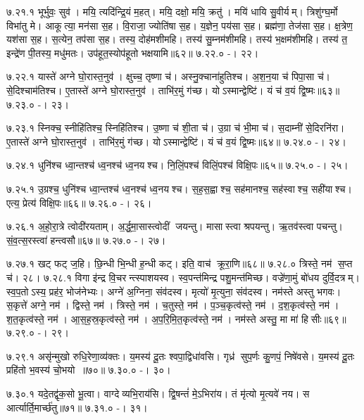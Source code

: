 ७.२१.१
भूर्भुवः॒ सुव॑। मयि॒ त्यदि॑न्द्रि॒यं म॒हत्। मयि॒ दक्षो॒ मयि॒ क्रतु॑। मयि॑ धायि सु॒वीर्यम्। त्रिशु॑ग्घ॒र्मो विभा॑तु मे। आकूत्या॒ मन॑सा स॒ह। वि॒राजा॒ ज्योति॑षा स॒ह। य॒ज्ञेन॒ पय॑सा स॒ह। ब्रह्म॑णा॒ तेज॑सा स॒ह। क्ष॒त्रेण॒ यश॑सा स॒ह। स॒त्येन॒ तप॑सा स॒ह। तस्य॒ दोह॑मशीमहि। तस्य॑ सु॒म्नम॑शीमहि। तस्य॑ भ॒क्षम॑शीमहि। तस्य॑ त॒ इन्द्रे॑ण पी॒तस्य॒ मधु॑मतः। उप॑हूत॒स्योप॑हूतो भक्षयामि॥६२॥
७.२२.०
-। २२।
\anuvakamend


७.२२.१
यास्ते॑ अग्ने घो॒रास्त॒नुव॑। क्षुच्च॒ तृष्णा च॑। अस्नु॒क्चाना॑हुतिश्च। अ॒श॒न॒या च॑ पिपा॒सा च॑। से॒दिश्चाम॑तिश्च। ए॒तास्ते॑ अग्ने घो॒रास्त॒नुव॑। ताभि॑र॒मुं ग॑च्छ। योऽस्मान्द्वेष्टि॑। यं च॑ व॒यं द्वि॒ष्मः॥६३॥
७.२३.०
-। २३।
\anuvakamend

७.२३.१
स्निक्च॒ स्नीहि॑तिश्च॒ स्निहि॑तिश्च। उ॒ष्णा च॑ शी॒ता च॑। उ॒ग्रा च॑ भी॒मा च॑। स॒दाम्नी॑ से॒दिरनि॑रा। ए॒तास्ते॑ अग्ने घो॒रास्त॒नुव॑। ताभि॑र॒मुं ग॑च्छ। योऽस्मान्द्वेष्टि॑। यं च॑ व॒यं द्वि॒ष्मः॥६४॥
७.२४.०
-। २४।
\anuvakamend

७.२४.१
धुनि॑श्च ध्वा॒न्तश्च॑ ध्व॒नश्च॑ ध्व॒नयश्च। नि॒लिं॒पश्च॑ विलिं॒पश्च॑ विक्षि॒पः॥६५॥
७.२५.०
-। २५।
\anuvakamend

७.२५.१
उ॒ग्रश्च॒ धुनि॑श्च ध्वा॒न्तश्च॑ ध्व॒नश्च॑ ध्व॒नयश्च। स॒ह॒स॒ह्वाश्च॒ सह॑मानश्च॒ सह॑स्वाश्च॒ सही॑याश्च। एत्य॒ प्रेत्य॑ विक्षि॒पः॥६६॥
७.२६.०
-। २६।
\anuvakamend

७.२६.१
अ॒हो॒रा॒त्रे त्वोदी॑रयताम्। अ॒र्द्ध॒मा॒सास्त्वोदीं जयन्तु। मासास्त्वा श्रपयन्तु। ऋ॒तव॑स्त्वा पचन्तु। सं॒व॒त्स॒रस्त्वा॑ हन्त्वसौ॥६७॥
७.२७.०
-। २७।
\anuvakamend

७.२७.१
खट् फट् ज॒हि। छि॒न्धी भि॒न्धी ह॒न्धी कट्। इति॒ वाच॑ क्रूरा॒णि॥६८॥
७.२८.०
त्रिस्ते॒ नम॑ स॒प्त च॑। २८।
७.२८.१
विगा इ॑न्द्र वि॒चरन्त्स्पाशयस्व। स्व॒पन्त॑मिन्द्र पशु॒मन्त॑मिच्छ। वज्रे॑णा॒मुं बो॑धय दुर्वि॒दत्रम्। स्व॒प॒तोऽस्य॒ प्रह॑र॒ भोज॑नेभ्यः। अग्ने॑ अ॒ग्निना॒ संव॑दस्व। मृत्यो॑ मृ॒त्युना॒ संव॑दस्व। नम॑स्ते अस्तु भगवः। स॒कृत्ते॑ अग्ने॒ नम॑। द्विस्ते॒ नम॑। त्रिस्ते॒ नम॑। च॒तुस्ते॒ नम॑। प॒ञ्च॒कृत्व॑स्ते॒ नम॑। द॒श॒कृत्व॑स्ते॒ नम॑। श॒त॒कृत्व॑स्ते॒ नम॑। आ॒स॒ह॒स्र॒कृत्व॑स्ते॒ नम॑। अ॒प॒रि॒मि॒त॒कृत्व॑स्ते॒ नम॑। नम॑स्ते अस्तु॒ मा मा॑ हिसीः॥६९॥
७.२९.०
-। २९।
\anuvakamend

७.२९.१
असृ॑न्मुखो रुधि॒रेणा॒व्य॑क्तः। य॒मस्य॑ दू॒तः  श्वपा॒द्विधा॑वसि। गृध्र॑ सुप॒र्णः कु॒णपं॒ निषे॑वसे। य॒मस्य॑ दू॒तः प्रहि॑तो भ॒वस्य॑ चो॒भयो॥७०॥
७.३०.०
-। ३०।
\anuvakamend

७.३०.१
यदे॒तद्वृ॑क॒सो भू॒त्वा। वाग्देव्यभि॒राय॑सि। द्वि॒षन्तं॑ मे॒ऽभिरा॑य। तं मृ॑त्यो मृ॒त्यवे॑ नय। स आर्त्यार्ति॒मार्च्छ॑तु॥७१॥
७.३१.०
-। ३१।
\anuvakamend

